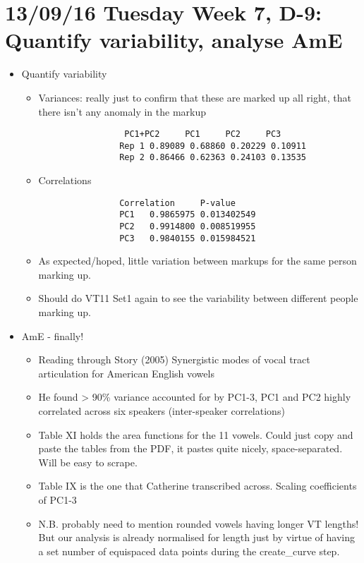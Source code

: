 \documentclass{article}
\begin{document}
\section*{13/09/16 Tuesday Week 7, D-9: Quantify variability, analyse AmE}
\begin{itemize}
    \item Quantify variability
    \begin{itemize}
        \item Variances: really just to confirm that these are marked up all right, that there isn't any anomaly in the markup \begin{verbatim}
                 PC1+PC2     PC1     PC2     PC3
                Rep 1 0.89089 0.68860 0.20229 0.10911
                Rep 2 0.86466 0.62363 0.24103 0.13535
        \end{verbatim}
        \item Correlations \begin{verbatim}
                Correlation     P-value
                PC1   0.9865975 0.013402549
                PC2   0.9914800 0.008519955
                PC3   0.9840155 0.015984521
        \end{verbatim}
        \item As expected/hoped, little variation between markups for the same person marking up.
        \item Should do VT11 Set1 again to see the variability between different people marking up.
    \end{itemize}
    \item AmE - finally!
    \begin{itemize}
        \item Reading through Story (2005) Synergistic modes of vocal tract articulation for American English vowels
        \item He found > 90\% variance accounted for by PC1-3, PC1 and PC2 highly correlated across six speakers (inter-speaker correlations)
        \item Table XI holds the area functions for the 11 vowels. Could just copy and paste the tables from the PDF, it pastes quite nicely, space-separated. Will be easy to scrape.
        \item Table IX is the one that Catherine transcribed across. Scaling coefficients of PC1-3
        \item N.B. probably need to mention rounded vowels having longer VT lengths! But our analysis is already normalised for length just by virtue of having a set number of equispaced data points during the create\_curve step.

\end{itemize}
\end{itemize}
\end{document}

